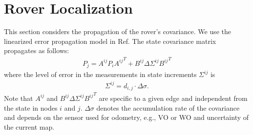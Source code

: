 \documentclass[conference]{IEEEtran}
\begin{document}


\section{Rover Localization}


This section considers the propagation of the rover's covariance. We use the linearized error propagation model in Ref\cite{IEEE:Inoue}.
The state covariance matrix propagates as follows:
\begin{align}
    P_j=A^{ij} P_i {A^{ij}}^T + B^{ij} \Delta \Sigma^{ij} {B^{ij}}^T
    \label{eq:Pj}
\end{align}
where the level of error in the measurements in state increments $\Sigma^{ij}$ is
\begin{align}
    \Sigma^{ij}=d_{i,j}\cdot \Delta \sigma.
\end{align}
Note that $A^{ij}$ and $B^{ij} \Delta \Sigma^{ij} {B^{ij}}^T$ are specific to a given edge and independent from the state in nodes $i$ and $j$. $\Delta \sigma$ denotes the accumulation rate of the covariance and depends on the sensor used for odometry, e.g., VO or WO and uncertainty of the current map.
\end{document}
